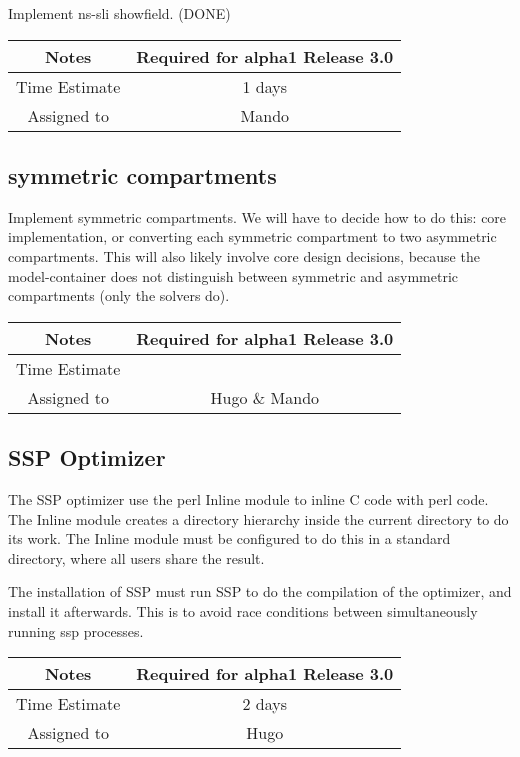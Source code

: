 \documentclass[12pt]{article}
\begin{document}
Implement ns-sli showfield. (DONE)

{
  \vspace{5mm}
  \centering
  \begin{tabular}{|c|c|}
    \hline
    Notes
    & Required for alpha1 Release 3.0 \\
    \hline
    Time Estimate
    & 1 days \\
    \hline
    Assigned to
    & Mando \\
    \hline
  \end{tabular}
}


\subsection{symmetric compartments}

Implement symmetric compartments.  We will have to decide how to do
this: core implementation, or converting each symmetric compartment to
two asymmetric compartments.  This will also likely involve core
design decisions, because the model-container does not distinguish
between symmetric and asymmetric compartments (only the solvers do).

{
  \vspace{5mm}
  \centering
  \begin{tabular}{|c|c|}
    \hline
    Notes
    & Required for alpha1 Release 3.0 \\
    \hline
    Time Estimate
    & \\
    \hline
    Assigned to
    & Hugo \& Mando \\
    \hline
  \end{tabular}
}


\subsection{SSP Optimizer}

The SSP optimizer use the perl Inline module to inline C code with
perl code.  The Inline module creates a directory hierarchy inside the
current directory to do its work.  The Inline module must be
configured to do this in a standard directory, where all users share
the result.

The installation of SSP must run SSP to do the compilation of the
optimizer, and install it afterwards.  This is to avoid race
conditions between simultaneously running ssp processes.

{
  \vspace{5mm}
  \centering
  \begin{tabular}{|c|c|}
    \hline
    Notes
    & Required for alpha1 Release 3.0 \\
    \hline
    Time Estimate
    & 2 days \\
    \hline
    Assigned to
    & Hugo \\
    \hline
  \end{tabular}
}
\end{document}
